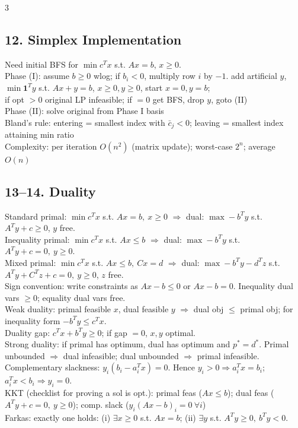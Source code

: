 \documentclass[8pt,landscape]{extarticle}
\newcommand{\1}{\mathbf{1}}
\newcommand{\0}{\mathbf{0}}
\begin{document}
\begin{multicols*}{3}
\subsection*{12. Simplex Implementation}
Need initial BFS for $\min c^Tx$ s.t. $Ax=b$, $x\ge0$. \\
Phase (I): assume $b\ge0$ wlog; if $b_i<0$, multiply row $i$ by $-1$. 
add artificial $y$, $\min \1^Ty$ s.t. $Ax+y=b$, $x\ge0,y\ge0$, start $x=0,y=b$; \\
if opt $>0$ original LP infeasible; if $=0$ get BFS, drop $y$, goto (II) \\
Phase (II): solve original from Phase I basis \\
Bland's rule: entering = smallest index with $\bar c_j<0$; leaving = smallest index attaining min ratio \\
Complexity: per iteration $O(n^2)$ (matrix update); worst-case $2^n$; average $O(n)$

\subsection*{13--14. Duality}
Standard primal: $\min c^Tx$ s.t. $Ax=b,\ x\ge0$
$\Rightarrow$ dual: $\max -b^Ty$ s.t. $A^Ty+c\ge0$, $y$ free. \\
Inequality primal: $\min c^Tx$ s.t. $Ax\le b$
$\Rightarrow$ dual: $\max -b^Ty$ s.t. $A^Ty+c=0,\ y\ge0$. \\
Mixed primal: $\min c^Tx$ s.t. $Ax\le b,\ Cx=d$
$\Rightarrow$ dual: $\max -b^Ty-d^Tz$ s.t. $A^Ty+C^Tz+c=0,\ y\ge0$, $z$ free. \\
Sign convention: write constraints as $Ax-b\le0$ or $Ax-b=0$. Inequality dual vars $\ge0$; equality dual vars free. \\
Weak duality: primal feasible $x$, dual feasible $y$ $\Rightarrow$ dual obj $\le$ primal obj; for inequality form $-b^Ty\le c^Tx$. \\
Duality gap: $c^Tx+b^Ty\ge0$; if gap $=0$, $x,y$ optimal. \\
Strong duality: if primal has optimum, dual has optimum and $p^*=d^*$. Primal unbounded $\Rightarrow$ dual infeasible; dual unbounded $\Rightarrow$ primal infeasible. \\
Complementary slackness: $y_i(b_i-a_i^Tx)=0$. Hence $y_i>0\Rightarrow a_i^Tx=b_i$; $a_i^Tx<b_i\Rightarrow y_i=0$. \\
KKT (checklist for proving a sol is opt.): primal feas ($Ax\le b$); dual feas ($A^Ty+c=0,\ y\ge0$); comp. slack ($y_i(Ax-b)_i=0\ \forall i$)\\
Farkas: exactly one holds: (i) $\exists x\ge0$ s.t. $Ax=b$; 
(ii) $\exists y$ s.t. $A^Ty\ge0,\ b^Ty<0$.


\end{multicols*}
\end{document}
